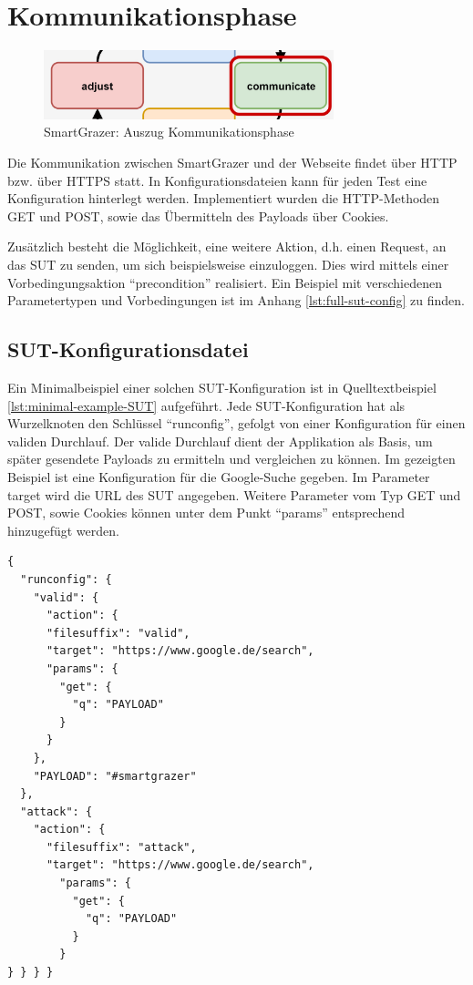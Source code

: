 \section{Kommunikationsphase}

\begin{figure}[htbp] 
	\centering
	\includegraphics[width=0.75\textwidth]{contents/images/SmartGrazerSectionCommunicate}
	\caption{SmartGrazer: Auszug Kommunikationsphase}
	\label{fig:SmartGrazer-sectionCommunicate}
\end{figure}

Die Kommunikation zwischen SmartGrazer und der Webseite findet über \ac{HTTP} bzw. über \ac{HTTPS} statt. In Konfigurationsdateien kann für jeden Test eine Konfiguration hinterlegt werden. Implementiert wurden die \ac{HTTP}-Methoden \gls{GET} und \gls{POST}, sowie das Übermitteln des Payloads über Cookies.

Zusätzlich besteht die Möglichkeit, eine weitere Aktion, d.h. einen Request, an das SUT zu senden, um sich beispielsweise einzuloggen. Dies wird mittels einer Vorbedingungsaktion ``precondition'' realisiert. Ein Beispiel mit verschiedenen Parametertypen und Vorbedingungen ist im Anhang \ref{lst:full-sut-config} zu finden.

\subsection{SUT-Konfigurationsdatei}
Ein Minimalbeispiel einer solchen SUT-Konfiguration ist in Quelltextbeispiel \ref{lst:minimal-example-SUT} aufgeführt. Jede SUT-Konfiguration hat als Wurzelknoten den Schlüssel ``runconfig'', gefolgt von einer Konfiguration für einen validen Durchlauf. Der valide Durchlauf dient der Applikation als Basis, um später gesendete Payloads zu ermitteln und vergleichen zu können. Im gezeigten Beispiel ist eine Konfiguration für die Google-Suche gegeben. Im Parameter target wird die \ac{URL} des SUT angegeben. Weitere Parameter vom Typ GET und POST, sowie Cookies können unter dem Punkt ``params'' entsprechend hinzugefügt werden.

\begin{lstlisting}[caption={SmartGrazer: Grundaufbau einer SUT-Konfigurationsdatei},label=lst:minimal-example-SUT]
{
  "runconfig": {
    "valid": {
      "action": {
      "filesuffix": "valid",
      "target": "https://www.google.de/search",
      "params": {
        "get": {
          "q": "PAYLOAD"
        }
      }
    },
    "PAYLOAD": "#smartgrazer"
  },
  "attack": {
    "action": {
      "filesuffix": "attack",
      "target": "https://www.google.de/search",
        "params": {
          "get": {
            "q": "PAYLOAD"
          }
        }
} } } }
\end{lstlisting}


\FloatBarrier